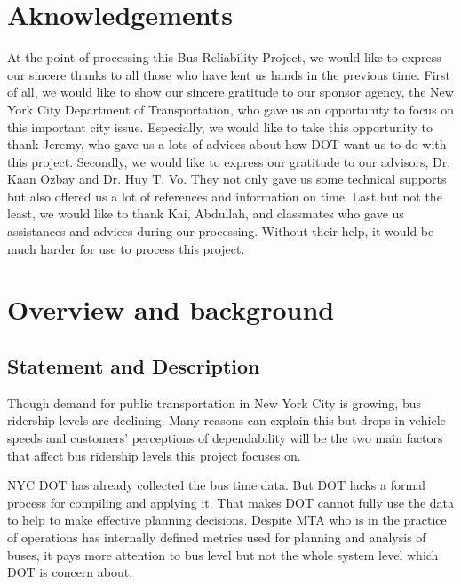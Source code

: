\documentclass[12pt]{report}
\begin{document}
\section*{Aknowledgements}
    At the point of processing this Bus Reliability Project, we would like to express our sincere thanks to all those who have lent us hands in the previous time. First of all, we would like to show our sincere gratitude to our sponsor agency, the New York City Department of Transportation, who gave us an opportunity to focus on this important city issue. Especially, we would like to take this opportunity to thank Jeremy, who gave us a lots of advices about how DOT want us to do with this project. Secondly, we would like to express our gratitude to our advisors, Dr. Kaan Ozbay and Dr. Huy T. Vo. They not only gave us some technical supports but also offered us a lot of references and information on time. Last but not the least, we would like to thank Kai, Abdullah, and classmates who gave us assistances and advices during our processing. Without their help, it would be much harder for use to process this project.


\newpage

\section{Overview and background}

\subsection{	Statement and Description}
Though demand for public transportation in New York City is growing, bus ridership levels are declining. Many reasons can explain this but drops in vehicle speeds and customers' perceptions of dependability will be the two main factors that affect bus ridership levels this project focuses on.

NYC DOT has already collected the bus time data. But DOT lacks a formal process for compiling and applying it. That makes DOT cannot fully use the data to help to make effective planning decisions. 
Despite MTA who is in the practice of operations has internally defined metrics used for planning and analysis of buses, it pays more attention to bus level but not the whole system level which DOT is concern about. 
\end{document}
